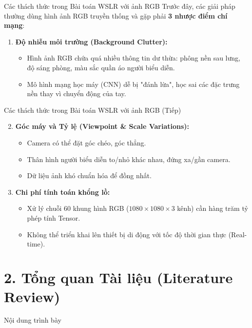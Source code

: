 \documentclass[aspectratio=169]{beamer}
\begin{document}
\begin{frame}{Các thách thức trong Bài toán WSLR với ảnh RGB}
    Trước đây, các giải pháp thường dùng hình ảnh RGB truyền thống và gặp phải \textbf{3 nhược điểm chí mạng}:
    \vspace{0.2cm}
    \begin{enumerate}
        \item \textbf{Độ nhiễu môi trường (Background Clutter):}
        \begin{itemize}
            \item Hình ảnh RGB chứa quá nhiều thông tin dư thừa: phông nền sau lưng, độ sáng phòng, màu sắc quần áo người biểu diễn.
            \item Mô hình mạng học máy (CNN) dễ bị "đánh lừa", học sai các đặc trưng nền thay vì chuyển động của tay.
        \end{itemize}
    \end{enumerate}
\end{frame}

\begin{frame}{Các thách thức trong Bài toán WSLR với ảnh RGB (Tiếp)}
    \begin{enumerate}
        \setcounter{enumi}{1}
        \item \textbf{Góc máy và Tỷ lệ (Viewpoint \& Scale Variations):}
        \begin{itemize}
            \item Camera có thể đặt góc chéo, góc thẳng.
            \item Thân hình người biểu diễn to/nhỏ khác nhau, đứng xa/gần camera.
            \item Dữ liệu ảnh khó chuẩn hóa để đồng nhất.
        \end{itemize}
        \vspace{0.3cm}
        \item \textbf{Chi phí tính toán khổng lồ:}
        \begin{itemize}
            \item Xử lý chuỗi 60 khung hình RGB ($1080 \times 1080 \times 3$ kênh) cần hàng trăm tỷ phép tính Tensor.
            \item Không thể triển khai lên thiết bị di động với tốc độ thời gian thực (Real-time).
        \end{itemize}
    \end{enumerate}
\end{frame}

\section{2. Tổng quan Tài liệu (Literature Review)}
\begin{frame}{Nội dung trình bày}
\end{frame}
\end{document}
